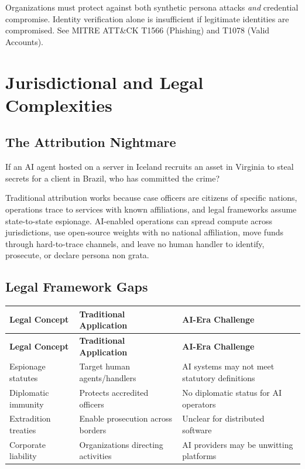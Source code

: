 \documentclass[11pt,letterpaper]{article}
\begin{document}
\begin{warnbox}
Organizations must protect against both synthetic persona attacks \textit{and} credential compromise. Identity verification alone is insufficient if legitimate identities are compromised. See MITRE ATT\&CK T1566 (Phishing) and T1078 (Valid Accounts).
\end{warnbox}

\section{Jurisdictional and Legal Complexities}\label{sec:legal}

\subsection{The Attribution Nightmare}

If an AI agent hosted on a server in Iceland recruits an asset in Virginia to steal secrets for a client in Brazil, who has committed the crime?

Traditional attribution works because case officers are citizens of specific nations, operations trace to services with known affiliations, and legal frameworks assume state-to-state espionage. AI-enabled operations can spread compute across jurisdictions, use open-source weights with no national affiliation, move funds through hard-to-trace channels, and leave no human handler to identify, prosecute, or declare persona non grata.

\subsection{Legal Framework Gaps}

{\small
\begin{longtable}{L{3cm}L{4cm}L{4.5cm}}
\toprule
\textbf{Legal Concept} & \textbf{Traditional Application} & \textbf{AI-Era Challenge} \\
\midrule
\endfirsthead
\toprule
\textbf{Legal Concept} & \textbf{Traditional Application} & \textbf{AI-Era Challenge} \\
\midrule
\endhead
Espionage statutes & Target human agents/handlers & AI systems may not meet statutory definitions \\*
Diplomatic immunity & Protects accredited officers & No diplomatic status for AI operators \\
Extradition treaties & Enable prosecution across borders & Unclear for distributed software \\*
Corporate liability & Organizations directing activities & AI providers may be unwitting platforms \\
\bottomrule
\end{longtable}}
\end{document}
